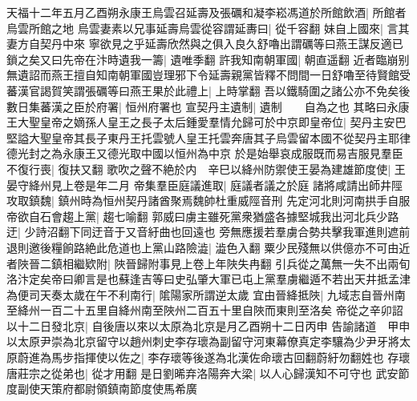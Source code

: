 天福十二年五月乙酉朔永康王烏雲召延壽及張礪和凝李崧馮道於所館飲酒|{
	所館者烏雲所館之地}
烏雲妻素以兄事延壽烏雲從容謂延夀曰|{
	從千容翻}
妹自上國來|{
	言其妻方自契丹中來}
寧欲見之乎延壽欣然與之俱入良久舒嚕出謂礪等曰燕王謀反適已鎖之矣又曰先帝在汴時遺我一籌|{
	遺唯季翻}
許我知南朝軍國|{
	朝直遥翻}
近者臨崩别無遺詔而燕王擅自知南朝軍國豈理邪下令延壽親黨皆釋不問間一日舒嚕至待賢館受蕃漢官謁賀笑謂張礪等曰燕王果於此禮上|{
	上時掌翻}
吾以鐵騎圍之諸公亦不免矣後數日集蕃漢之臣於府署|{
	恒州府署也}
宣契丹主遺制|{
	遺制　　自為之也}
其略曰永康王大聖皇帝之嫡孫人皇王之長子太后鍾愛羣情允歸可於中京即皇帝位|{
	契丹主安巴堅謚大聖皇帝其長子東丹王托雲號人皇王托雲奔唐其子烏雲留本國不從契丹主耶律德光封之為永康王又德光取中國以恒州為中京}
於是始舉哀成服既而易吉服見羣臣不復行喪|{
	復扶又翻}
歌吹之聲不絶於内　辛巳以絳州防禦使王晏為建雄節度使|{
	王晏守絳州見上卷是年二月}
帝集羣臣庭議進取|{
	庭議者議之於庭}
諸將咸請出師井陘攻取鎮魏|{
	鎮州時為恒州契丹諸酋聚焉魏帥杜重威陘音刑}
先定河北則河南拱手自服帝欲自石會趨上黨|{
	趨七喻翻}
郭威曰虜主雖死黨衆猶盛各據堅城我出河北兵少路迂|{
	少詩沼翻下同迂音于又音紆曲也回遠也}
旁無應援若羣虜合勢共擊我軍進則遮前退則邀後糧餉路絶此危道也上黨山路險澁|{
	澁色入翻}
粟少民殘無以供億亦不可由近者陜晉二鎮相繼欵附|{
	陜晉歸附事見上卷上年陜失冉翻}
引兵從之萬無一失不出兩旬洛汴定矣帝曰卿言是也蘇逢吉等曰史弘肇大軍已屯上黨羣虜繼遁不若出天井抵孟津為便司天奏太歲在午不利南行|{
	隂陽家所謂逆太歲}
宜由晉絳抵陜|{
	九域志自晉州南至絳州一百二十五里自絳州南至陜州二百五十里自陜而東則至洛矣}
帝從之辛卯詔以十二日發北京|{
	自後唐以來以太原為北京是月乙酉朔十二日丙申}
告諭諸道　甲申以太原尹崇為北京留守以趙州刺史李存瓌為副留守河東幕僚真定李驤為少尹牙將太原蔚進為馬步指揮使以佐之|{
	李存瓌等後遂為北漢佐命瓌古回翻蔚紆勿翻姓也}
存瓌唐莊宗之從弟也|{
	從才用翻}
是日劉晞弃洛陽奔大梁|{
	以人心歸漢知不可守也}
武安節度副使天策府都尉領鎮南節度使馬希廣

